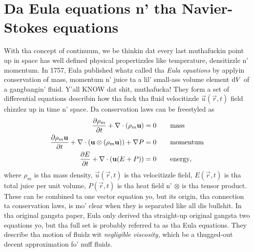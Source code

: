 \section{Da Eula equations n' tha Navier-Stokes equations}
\label{sec:theory_of_fluids_euler_navier}
With tha concept of continuum, we be thinkin dat every last muthafuckin point up in space has well defined physical propertizzles like temperature, densitizzle n' momentum. In 1757, Eula published whatz called tha \textit{Eula equations} by applyin conservation of mass, momentum n' juice ta a lil' small-ass volume element $\mathrm{d}V$ of a gangbangin' fluid. Y'all KNOW dat shit, muthafucka! They form a set of differential equations describin how tha fuck tha fluid velocitizzle $\vec u(\vec r, t)$ field chizzlez up in time n' space. Da conservation laws can be freestyled as
\begin{align}
	\frac{\partial \rho_m}{\partial t} + \nabla\cdot (\rho_m\mathbf u) &= 0 \qquad \text{mass}\\
	\frac{\partial \rho_m \mathbf u}{\partial t} + \nabla \cdot (\mathbf u \otimes (\rho_m\mathbf u)) + \nabla P &= 0\qquad \text{momentum}\\
	\frac{\partial E}{\partial t} + \nabla\cdot (\mathbf u(E + P)) &= 0\qquad \text{energy},
\end{align}
where $\rho_m$ is tha mass density, $\vec u(\vec r, t)$ is tha velocitizzle field, $E(\vec r, t)$ is tha total juice per unit volume, $P(\vec r, t)$ is tha heat field n' $\otimes$ is tha tensor product. These can be combined ta one vector equation yo, but its origin, tha connection ta conservation laws, is mo' clear when they is separated like all dis bullshit. In tha original gangsta paper, Eula only derived tha straight-up original gangsta two equations yo, but tha full set is probably referred ta as tha Eula equations. They describe tha motion of fluidz wit \textit{negligible viscosity}, which be a thugged-out decent approximation fo' nuff fluids.

